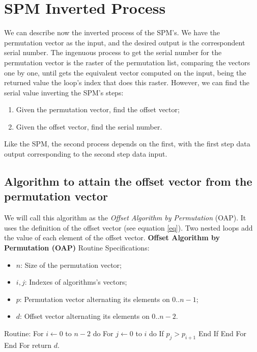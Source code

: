 \documentclass {amsart}
\begin{document}
\section*{SPM Inverted Process}
We can describe now the inverted process of the SPM's. We have the
permutation vector as the input, and the desired output is the
correspondent serial number. The ingenuous process to get the
serial number for the permutation vector is the raster of the
permutation list, comparing the vectors one by one, until gets the
equivalent vector computed on the input, being the returned value
the loop's index that does this raster. However, we can find the
serial value inverting the SPM's steps:
\begin{enumerate}
    \item Given the permutation vector, find the offset vector;
    \item Given the offset vector, find the serial number.
\end{enumerate}

Like the SPM, the second process depends on the first, with the
first step data output corresponding to the second step data
input.
\subsection*{Algorithm to attain the offset vector from the permutation vector}
We will call this algorithm as the \emph{Offset Algorithm by
Permutation} (OAP). It uses the definition of the offset vector
(see equation \ref{eq}). Two nested loops add the value of each
element of the offset vector.
\newline \newline
\textbf{Offset Algorithm by
Permutation (OAP)}
\newline
Routine Specifications:
\begin{itemize}
    \item {$n$}: Size of the permutation vector;
    \item {$i, j$}: Indexes of algorithms's vectors;
    \item {$p$}: Permutation vector alternating its elements on {$0..n-1$};
    \item {$d$}: Offset vector alternating its elements on {$0..n-2$}.
\end{itemize}
Routine:
\newline
\indent For {$i \leftarrow 0$} to {$n-2$} do \newline \indent
\indent For {$j \leftarrow 0$} to {$i$} do \newline \indent
\indent \indent If {$p_j > p_{i+1}$} \newline \indent \indent
\indent {} \newline \indent
\indent \indent End If \newline \indent \indent End For \newline
\indent End For \newline return {$d$}.
\end{document}
